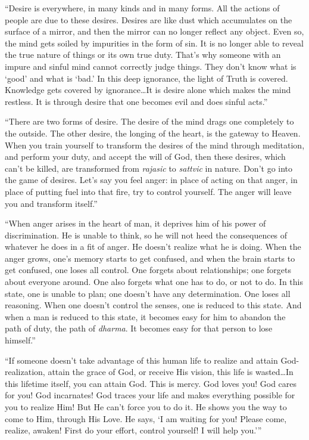 \enquote{Desire is everywhere, in many kinds and in many forms. All the actions of people are due to these desires. Desires are like dust which accumulates on the surface of a mirror, and then the mirror can no longer reflect any object. Even so, the mind gets soiled by impurities in the form of sin. It is no longer able to reveal the true nature of things or its own true duty. That’s why someone with an impure and sinful mind cannot correctly judge things. They don’t know what is \enquote{good} and what is \enquote{bad.} In this deep ignorance, the light of Truth is covered. Knowledge gets covered by ignorance\ldots It is desire alone which makes the mind restless. It is through desire that one becomes evil and does sinful acts.}

\enquote{There are two forms of desire. The desire of the mind drags one completely to the outside. The other desire, the longing of the heart, is the gateway to Heaven. When you train yourself to transform the desires of the mind through meditation, and perform your duty, and accept the will of God, then these desires, which can’t be killed, are transformed from \textit{rajasic} to \textit{sattvic} in nature. Don’t go into the game of desires. Let’s say you feel anger: in place of acting on that anger, in place of putting fuel into that fire, try to control yourself. The anger will leave you and transform itself.}

\enquote{When anger arises in the heart of man, it deprives him of his power of discrimination. He is unable to think, so he will not heed the consequences of whatever he does in a fit of anger. He doesn’t realize what he is doing. When the anger grows, one’s memory starts to get confused, and when the brain starts to get confused, one loses all control. One forgets about relationships; one forgets about everyone around. One also forgets what one has to do, or not to do. In this state, one is unable to plan; one doesn’t have any determination. One loses all reasoning. When one doesn’t control the senses, one is reduced to this state. And when a man is reduced to this state, it becomes easy for him to abandon the path of duty, the path of \textit{dharma}. It becomes easy for that person to lose himself.}

\enquote{If someone doesn’t take advantage of this human life to realize and attain God-realization, attain the grace of God, or receive His vision, this life is wasted\ldots In this lifetime itself, you can attain God. This is mercy. God loves you! God cares for you! God incarnates! God traces your life and makes everything possible for you to realize Him! But He can’t force you to do it. He shows you the way to come to Him, through His Love. He says, \enquote{I am waiting for you! Please come, realize, awaken! First do your effort, control yourself! I will help you.}}

